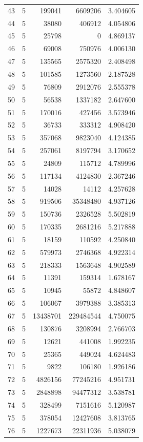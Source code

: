 \begin{longtable}{rrrrr}
43 & 5 & 199041 & 6609206 & 3.404605\\
44 & 5 & 38080 & 406912 & 4.054806\\
45 & 5 & 25798 & 0 & 4.869137\\
46 & 5 & 69008 & 750976 & 4.006130\\
47 & 5 & 135565 & 2575320 & 2.408498\\
48 & 5 & 101585 & 1273560 & 2.187528\\
49 & 5 & 76809 & 2912076 & 2.555378\\
50 & 5 & 56538 & 1337182 & 2.647600\\
51 & 5 & 170016 & 427456 & 3.573946\\
52 & 5 & 36733 & 333312 & 4.908420\\
53 & 5 & 357068 & 9823040 & 4.124385\\
54 & 5 & 257061 & 8197794 & 3.170652\\
55 & 5 & 24809 & 115712 & 4.789996\\
56 & 5 & 117134 & 4124830 & 2.367246\\
57 & 5 & 14028 & 14112 & 4.257628\\
58 & 5 & 919506 & 35348480 & 4.937126\\
59 & 5 & 150736 & 2326528 & 5.502819\\
60 & 5 & 170335 & 2681216 & 5.217888\\
61 & 5 & 18159 & 110592 & 4.250840\\
62 & 5 & 579973 & 2746368 & 4.922314\\
63 & 5 & 218333 & 1563648 & 4.902589\\
64 & 5 & 11391 & 159314 & 1.678167\\
65 & 5 & 10945 & 55872 & 4.848607\\
66 & 5 & 106067 & 3979388 & 3.385313\\
67 & 5 & 13438701 & 229484544 & 4.750075\\
68 & 5 & 130876 & 3208994 & 2.766703\\
69 & 5 & 12621 & 441008 & 1.992235\\
70 & 5 & 25365 & 449024 & 4.624483\\
71 & 5 & 9822 & 106180 & 1.926186\\
72 & 5 & 4826156 & 77245216 & 4.951731\\
73 & 5 & 2848898 & 94477312 & 3.538781\\
74 & 5 & 328499 & 7151616 & 5.120987\\
75 & 5 & 378054 & 12427608 & 3.813765\\
76 & 5 & 1227673 & 22311936 & 5.038079\\

\end{longtable}
